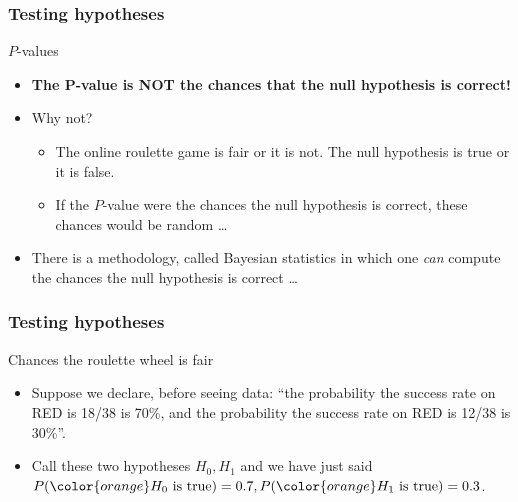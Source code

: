 \documentclass[handout]{beamer}
\begin{document}

   \begin{frame} \frametitle{Testing hypotheses}

   \begin{block}
   {$P$-values}
   \begin{itemize}

   \item {\bf \color{red} The P-value is NOT the chances
   that the null hypothesis is correct!}

   \item Why not?
   \begin{itemize}
   \item The online roulette game is fair or it is not. The null
   hypothesis is true or it is false.
   \item If the {\color{orange} $P$-value} were the chances
    the null hypothesis is correct, these chances would be {\color{orange} random} \dots
   \end{itemize}

   \item There is a methodology, called Bayesian statistics in which
   one {\em can} compute the chances the null hypothesis is correct \dots

   \end{itemize}
   \end{block}
   \end{frame}


   \begin{frame} \frametitle{Testing hypotheses}

   \begin{block}
   {Chances the roulette wheel is fair}
   \begin{itemize}

   \item Suppose we declare, before seeing data: ``the probability
   the success rate on {\color{red} RED} is 18/38 is 70\%, and the probability
   the success rate on {\color{red} RED} is 12/38 is 30\%''.

   \item Call these two hypotheses $H_0, H_1$ and we have just said
   $P({\color{orange} \text{$H_0$ is true}})=0.7, P({\color{orange} \text{$H_1$ is true}})=0.3$.

   \end{itemize}
   \end{block}
   \end{frame}
\end{document}
